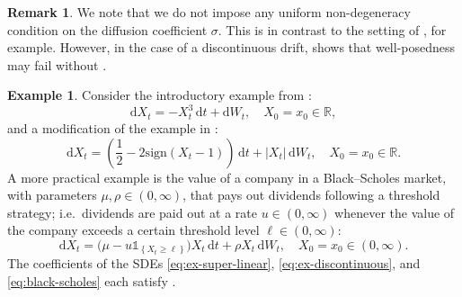 \documentclass[onseside, final]{amsart}
\theoremstyle{definition}
\newtheorem{example}[theorem]{Example}
\newtheorem{remark}[theorem]{Remark}
\newcommand{\R}{\mathbb R}
\newcommand{\sign}{\mathrm{sign}}
\newcommand{\D}{\,\mathrm{d}}
\newcommand{\ds}{\mathrm{d}}
\newcommand{\ind}[1]{\mathds{1}_{\!\left\{{#1}\right\}\!}}
\numberwithin{equation}{section}
\begin{document}
	\begin{remark}\label{rem:non-degeneracy}
		We note that we do not impose any uniform non-degeneracy condition on the diffusion coefficient $\sigma$. This is in contrast to the setting of \citet{DaGeLe23}, for example. However, in the case of a discontinuous drift, \cite[Example 4.2]{LeSzTh15} shows that well-posedness may fail without .
	\end{remark}
	
	\begin{example}\label{ex:super-linear}
		Consider the introductory example from \citep{HuJeKl11}:
		\begin{equation}\label{eq:ex-super-linear}
			\ds X_t = - X_t^3 \D t + \ds W_t, \quad X_0 = x_0 \in \R,
		\end{equation}
		and a modification of the example in \citep[Section 2]{Sz21}:
		\begin{equation}\label{eq:ex-discontinuous}
			\ds X_t = \!\left(\frac12 - 2\sign(X_t - 1)\right)\! \D t + |X_t| \D W_t, \quad X_0 = x_0 \in \R.
		\end{equation}
		A more practical example is the value of a company in a Black--Scholes market, with parameters $\mu, \rho \in (0, \infty)$, that pays out dividends following a threshold strategy; i.e.\ dividends are paid out at a rate $u \in (0, \infty)$ whenever the value of the company exceeds a certain threshold level $\ell \in (0, \infty)$:
		\begin{equation}\label{eq:black-scholes}
			\ds X_t = \bigl(\mu-u \ind{X_t\ge \ell}\bigr) X_t \D t + \rho X_t \D W_t, \quad X_0 = x_0 \in (0,\infty).
		\end{equation}
		The coefficients of the SDEs \eqref{eq:ex-super-linear}, \eqref{eq:ex-discontinuous}, and \eqref{eq:black-scholes} each satisfy .
	\end{example}
\end{document}

